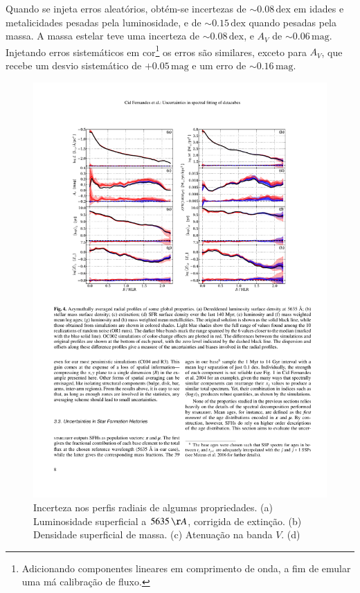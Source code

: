 Quando se injeta erros aleatórios, obtém-se incertezas de $\sim
0.08\,\mathrm{dex}$ em idades e metalicidades pesadas pela luminosidade, e de
$\sim 0.15\,\mathrm{dex}$ quando pesadas pela massa. A massa estelar teve uma
incerteza de $\sim 0.08\,\mathrm{dex}$, e $A_V$ de $\sim 0.06\,\mathrm{mag}$.
Injetando erros sistemáticos em cor\footnote{Adicionando componentes lineares em
comprimento de onda, a fim de emular uma má calibração de fluxo.} os erros são
similares, exceto para $A_V$, que recebe um desvio sistemático de
$+0.05\,\mathrm{mag}$ e um erro de $\sim 0.16\,\mathrm{mag}$.

\begin{figure}
	\includegraphics[width=1.0\columnwidth]{figuras/resolving2}
	\caption[Incerteza nos perfis radiais] {Incerteza nos perfis radiais de
	algumas propriedades. (a) Luminosidade superficial a $5635\,\AA$, corrigida de
	extinção. (b) Densidade superficial de massa. (c) Atenuação na banda $V$. (d)
}
\end{figure}
